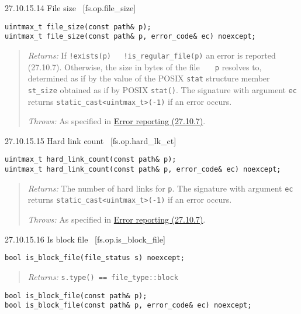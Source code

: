27.10.15.14 File size~ {[}fs.op.file\_size{]}

\begin{verbatim}
uintmax_t file_size(const path& p);
uintmax_t file_size(const path& p, error_code& ec) noexcept;
\end{verbatim}

\begin{quote}
\emph{Returns:} If
\texttt{!exists(p)\ \ \textbar{}\textbar{}\ !is\_regular\_file(p)} an
error is reported (27.10.7). Otherwise, the size in bytes of the file
\texttt{\ \ \ p} resolves to, determined as if by the value of the POSIX
\texttt{stat} structure member \texttt{st\_size} obtained as if by POSIX
\texttt{stat()}. The signature with argument \texttt{ec} returns
\texttt{static\_cast\textless{}uintmax\_t\textgreater{}(-1)} if an error
occurs.

\emph{Throws:} As specified in \hyperref[Error-reporting]{Error
reporting (27.10.7)}.
\end{quote}

27.10.15.15 Hard link count~ {[}fs.op.hard\_lk\_ct{]}

\begin{verbatim}
uintmax_t hard_link_count(const path& p);
uintmax_t hard_link_count(const path& p, error_code& ec) noexcept;
\end{verbatim}

\begin{quote}
\emph{Returns:} The number of hard links for \texttt{p}. The signature
with argument \texttt{ec} returns
\texttt{static\_cast\textless{}uintmax\_t\textgreater{}(-1)} if an error
occurs.

\emph{Throws:} As specified in \hyperref[Error-reporting]{Error
reporting (27.10.7)}.
\end{quote}

27.10.15.16 Is block file~ {[}fs.op.is\_block\_file{]}

\begin{verbatim}
bool is_block_file(file_status s) noexcept;
\end{verbatim}

\begin{quote}
\emph{Returns:} \texttt{s.type()\ ==\ file\_type::block}
\end{quote}

\begin{verbatim}
bool is_block_file(const path& p);
bool is_block_file(const path& p, error_code& ec) noexcept;
\end{verbatim}

